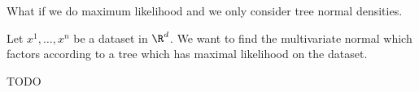 

What if we do maximum likelihood and we only consider tree normal densities.


Let $x^1, \dots, x^n$ be a dataset in $\R^d$.
We want to find the multivariate normal which factors according to a tree which has maximal likelihood on the dataset.


\begin{prop}
TODO
\end{prop}
